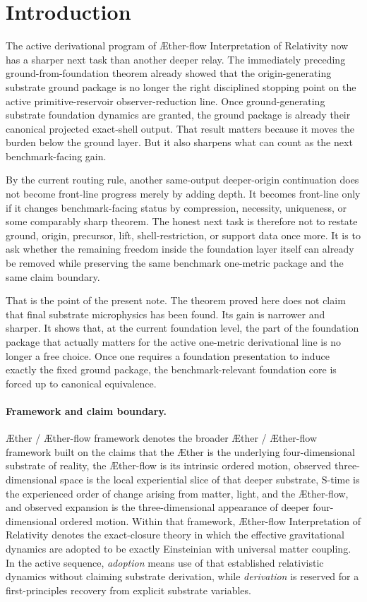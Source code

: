\documentclass[11pt]{article}
\newcommand{\Aether}{\AE{}ther}
\newcommand{\Aflow}{\AE{}ther-flow}
\newcommand{\TheoryName}{\Aflow{} Interpretation of Relativity}
\newcommand{\TheoryProgram}{\Aether{} / \Aflow{} framework}
\begin{document}
\section{Introduction}

The active derivational program of \TheoryName{} now has a sharper next task than another deeper relay. The immediately preceding ground-from-foundation theorem already showed that the origin-generating substrate ground package is no longer the right disciplined stopping point on the active primitive-reservoir observer-reduction line. Once ground-generating substrate foundation dynamics are granted, the ground package is already their canonical projected exact-shell output. That result matters because it moves the burden below the ground layer. But it also sharpens what can count as the next benchmark-facing gain.

By the current routing rule, another same-output deeper-origin continuation does not become front-line progress merely by adding depth. It becomes front-line only if it changes benchmark-facing status by compression, necessity, uniqueness, or some comparably sharp theorem. The honest next task is therefore not to restate ground, origin, precursor, lift, shell-restriction, or support data once more. It is to ask whether the remaining freedom inside the foundation layer itself can already be removed while preserving the same benchmark one-metric package and the same claim boundary.

That is the point of the present note. The theorem proved here does not claim that final substrate microphysics has been found. Its gain is narrower and sharper. It shows that, at the current foundation level, the part of the foundation package that actually matters for the active one-metric derivational line is no longer a free choice. Once one requires a foundation presentation to induce exactly the fixed ground package, the benchmark-relevant foundation core is forced up to canonical equivalence.

\paragraph{Framework and claim boundary.}
\TheoryProgram{} denotes the broader \Aether{} / \Aflow{} framework built on the claims that the \Aether{} is the underlying four-dimensional substrate of reality, the \Aflow{} is its intrinsic ordered motion, observed three-dimensional space is the local experiential slice of that deeper substrate, S-time is the experienced order of change arising from matter, light, and the \Aflow{}, and observed expansion is the three-dimensional appearance of deeper four-dimensional ordered motion. Within that framework, \TheoryName{} denotes the exact-closure theory in which the effective gravitational dynamics are adopted to be exactly Einsteinian with universal matter coupling. In the active sequence, \emph{adoption} means use of that established relativistic dynamics without claiming substrate derivation, while \emph{derivation} is reserved for a first-principles recovery from explicit substrate variables.
\end{document}

